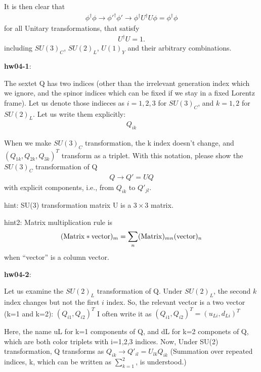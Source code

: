 \documentclass[12pt]{article}
\begin{document}
  It is then clear that
\begin{eqnarray}
    \phi^\dagger \phi \to {\phi'}^\dagger \phi'
                    \to \phi^\dagger U^\dagger U \phi
                    = \phi^\dagger \phi
\end{eqnarray}
  for all Unitary transformations, that satisfy
\begin{eqnarray}
    U^\dagger U = 1.
\end{eqnarray}
   including $SU(3)_C$, $SU(2)_L$, $U(1)_Y$ and their arbitrary
  combinations.

{\bf hw04-1}:

  The sextet Q has two indices (other than the irrelevant
  generation index which we ignore, and the spinor indices
  which can be fixed if we stay in a fixed Lorentz frame).
  Let us denote those indieces as $i=1,2,3$ for $SU(3)_C$,
  and $k=1,2$ for $SU(2)_L$.  Let us write them explicitly:
  \begin{eqnarray}
    Q_{ik}
  \end{eqnarray}
  

  When we make $SU(3)_C$ transformation, the k index doesn't
  change, and
  $( Q_{1k}, Q_{2k}, Q_{3k} )^T$
  transform as a triplet.  With this notation, please
  show the $SU(3)_C$ transformation of Q
\begin{eqnarray}
    Q \to Q' = U Q
\end{eqnarray}
   with explicit components, i.e., from $Q_{ik}$ to $Q'_{jl}$.

  hint: SU(3) transformation matrix U is a $3 \times 3$ matrix.

  hint2: Matrix multiplication rule is
  \begin{eqnarray}
    ( {\rm Matrix} * {\rm vector} )_m = \sum_n ({\rm Matrix})_{mn} ({\rm vector})_n
  \end{eqnarray}
  when ``vector'' is a column vector.

{\bf hw04-2}:

  Let us examine the $SU(2)_L$ transformation of Q.
  Under $SU(2)_L$, the second $k$ index changes but not
  the first $i$ index.  So, the relevant vector is
  a two vector (k=1 and k=2):
  $( Q_{i1}, Q_{i2} )^T$
  I often write it as
  $( Q_{i1}, Q_{i2} )^T  = ( u_{Li}, d_{Li} )^T$

  Here, the name uL for k=1 components of Q, and
  dL for k=2 componets of Q, which are both color
  triplets with i=1,2,3 indices.  Now, Under SU(2)
  transformation, Q transforms as
  $Q_{ik} \to Q'_{il} = U_{lk} Q_{ik}$
 (Summation over repeated indices, k, which can be written as
  $\sum_{k=1}^{2}$, is understood.)
\end{document}
